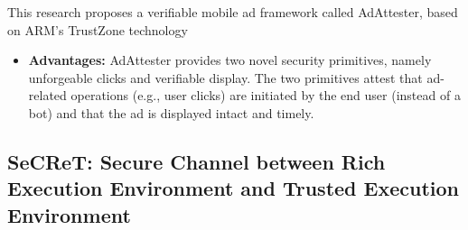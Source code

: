 \documentclass[conference]{IEEEtran}
\begin{document}
\cite{misc8} This research proposes a verifiable mobile ad framework called AdAttester, based on ARM’s TrustZone technology
\begin{itemize}
    \item \textbf{Advantages:} AdAttester provides two novel security primitives, namely unforgeable clicks and verifiable display. The two primitives attest that ad-related operations (e.g., user clicks) are initiated by the end user (instead of a bot) and that the ad is displayed intact and timely.
\end{itemize}


\subsection{SeCReT: Secure Channel between Rich Execution Environment and Trusted Execution Environment}
\end{document}
